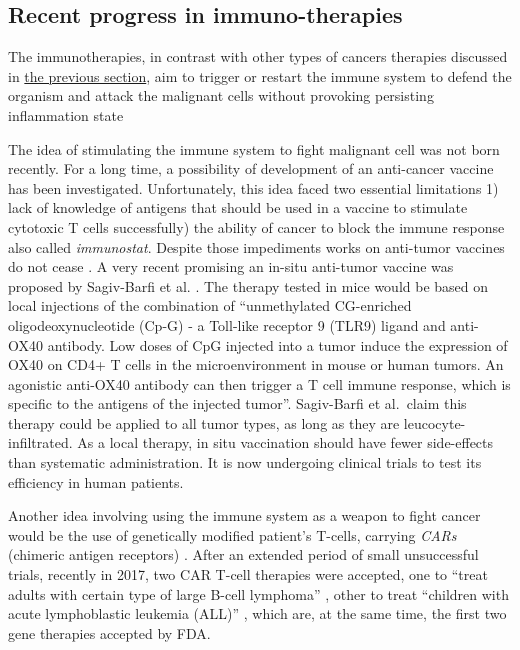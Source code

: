 \documentclass[12pt,]{book}
\theoremstyle{definition}
\theoremstyle{definition}
\theoremstyle{definition}
\theoremstyle{remark}
\begin{document}
\hypertarget{recent-progress-in-immuno-therapies}{%
\subsection{Recent progress in
immuno-therapies}\label{recent-progress-in-immuno-therapies}}

The immunotherapies, in contrast with other types of cancers therapies
discussed in \protect\hyperlink{cancer_Therapies}{the previous section},
aim to trigger or restart the immune system to defend the organism and
attack the malignant cells without provoking persisting inflammation
state \citep{Predina2013}

The idea of stimulating the immune system to fight malignant cell was
not born recently. For a long time, a possibility of development of an
anti-cancer vaccine has been investigated. Unfortunately, this idea
faced two essential limitations 1) lack of knowledge of antigens that
should be used in a vaccine to stimulate cytotoxic T cells successfully)
the ability of cancer to block the immune response also called
\emph{immunostat}. Despite those impediments works on anti-tumor
vaccines do not cease \citep{Palucka2013}. A very recent promising an
in-situ anti-tumor vaccine was proposed by Sagiv-Barfi et al.
\citep{Sagiv-Barfi2018}. The therapy tested in mice would be based on
local injections of the combination of ``unmethylated CG-enriched
oligodeoxynucleotide (Cp-G) - a Toll-like receptor 9 (TLR9) ligand and
anti-OX40 antibody. Low doses of CpG injected into a tumor induce the
expression of OX40 on CD4+ T cells in the microenvironment in mouse or
human tumors. An agonistic anti-OX40 antibody can then trigger a T cell
immune response, which is specific to the antigens of the injected
tumor''. Sagiv-Barfi et al.~claim this therapy could be applied to all
tumor types, as long as they are leucocyte-infiltrated. As a local
therapy, in situ vaccination should have fewer side-effects than
systematic administration. It is now undergoing clinical trials to test
its efficiency in human patients.

Another idea involving using the immune system as a weapon to fight
cancer would be the use of genetically modified patient's T-cells,
carrying \emph{CARs} (chimeric antigen receptors) \citep{Jackson2016}.
After an extended period of small unsuccessful trials, recently in 2017,
two CAR T-cell therapies were accepted, one to ``treat adults with
certain type of large B-cell lymphoma'' \citep{FDACARTadult}, other to
treat ``children with acute lymphoblastic leukemia (ALL)''
\citep{FDACARTALL}, which are, at the same time, the first two gene
therapies accepted by FDA.
\end{document}
